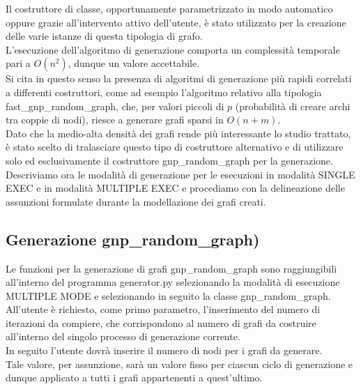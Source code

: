 Il costruttore di classe, opportunamente parametrizzato in modo automatico oppure grazie all'intervento attivo dell'utente, è stato utilizzato per la creazione delle varie istanze di questa tipologia di grafo.\\

L'esecuzione dell'algoritmo di generazione comporta un complessità temporale pari a \(O(n^2)\), dunque un valore accettabile.\\
Si cita in questo senso la presenza di algoritmi di generazione più rapidi correlati a differenti costruttori, come ad esempio l'algoritmo relativo alla tipologia fast\_gnp\_random\_graph, che, per valori piccoli di $p$ (probabilità di creare archi tra coppie di nodi), riesce a generare grafi sparsi in \(O(n+m)\).\\

Dato che la medio-alta densità dei grafi rende più interessante lo studio trattato, è stato scelto di tralasciare questo tipo di costruttore alternativo e di utilizzare solo ed esclusivamente il costruttore gnp\_random\_graph per la generazione.\\

Descriviamo ora le modalità di generazione per le esecuzioni in modalità SINGLE EXEC e in modalità MULTIPLE EXEC e procediamo con la delineazione delle assunzioni formulate durante la modellazione dei grafi creati.\\

\subsection{Generazione gnp\_random\_graph)}
\justify
Le funzioni per la generazione di grafi gnp\_random\_graph sono raggiungibili all'interno del programma generator.py selezionando la modalità di esecuzione MULTIPLE MODE e selezionando in seguito la classe gnp\_random\_graph.\\

All'utente è richiesto, come primo parametro, l'inserimento del numero di iterazioni da compiere, che corrispondono al numero di grafi da costruire all'interno del singolo processo di generazione corrente.\\

In seguito l'utente dovrà inserire il numero di nodi per i grafi da generare.\\
Tale valore, per assunzione, sarà un valore fisso per ciascun ciclo di generazione e dunque applicato a tutti i grafi appartenenti a quest'ultimo.\\

